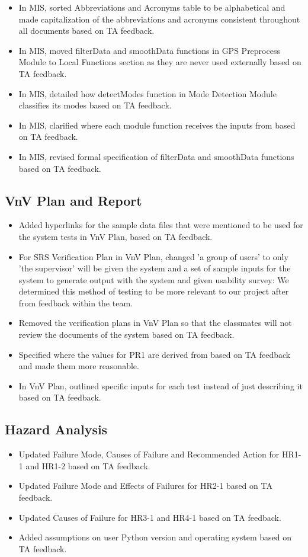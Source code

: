 \documentclass{article}
\begin{document}
\begin{itemize}
    \item In MIS, sorted Abbreviations and Acronyms table to be alphabetical and made capitalization of the abbreviations and acronyms consistent throughout all documents based on TA feedback.
    \item In MIS, moved filterData and smoothData functions in GPS Preprocess Module to Local Functions section as they are never used externally based on TA feedback.
    \item In MIS, detailed how detectModes function in Mode Detection Module classifies its modes based on TA feedback.
    \item In MIS, clarified where each module function receives the inputs from based on TA feedback.
    \item In MIS, revised formal specification of filterData and smoothData functions based on TA feedback.
    
\end{itemize}

\subsection{VnV Plan and Report}
\begin{itemize}
    \item Added hyperlinks for the sample data files that were mentioned to be used for the system tests in VnV Plan, based on TA feedback.
    \item For SRS Verification Plan in VnV Plan, changed 'a group of users' to only 'the supervisor' will be given the system and a set of sample inputs for the system to generate output with the system and given usability survey: We determined this method of testing to be more relevant to our project after from feedback within the team.
    \item Removed the verification plans in VnV Plan so that the classmates will not review the documents of the system based on TA feedback.
    \item Specified where the values for PR1 are derived from based on TA feedback and made them more reasonable.
    \item In VnV Plan, outlined specific inputs for each test instead of just describing it based on TA feedback.
\end{itemize}

\subsection{Hazard Analysis}
\begin{itemize}
    \item Updated Failure Mode, Causes of Failure and Recommended Action for HR1-1 and HR1-2 based on TA feedback.
    \item Updated Failure Mode and Effects of Failures for HR2-1 based on TA feedback.
    \item Updated Causes of Failure for HR3-1 and HR4-1 based on TA feedback.
    \item Added assumptions on user Python version and operating system based on TA feedback. 
\end{itemize}
\end{document}
